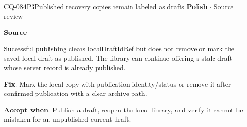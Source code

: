 \begin{finding}{CQ-084}{P3}{Published recovery copies remain labeled as drafts}
\textbf{Polish} $\cdot$ Source review\par
\textbf{Source}\quad{}\par
Successful publishing clears localDraftIdRef but does not remove or mark the saved local draft as published. The library can continue offering a stale draft whose server record is already published.\par
\textbf{Fix.} Mark the local copy with publication identity/status or remove it after confirmed publication with a clear archive path.\par
\textbf{Accept when.} Publish a draft, reopen the local library, and verify it cannot be mistaken for an unpublished current draft.
\end{finding}
\clearpage

